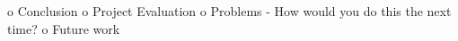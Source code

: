 o   Conclusion
o   Project Evaluation
o   Problems - How would you do this the next time?
o   Future work